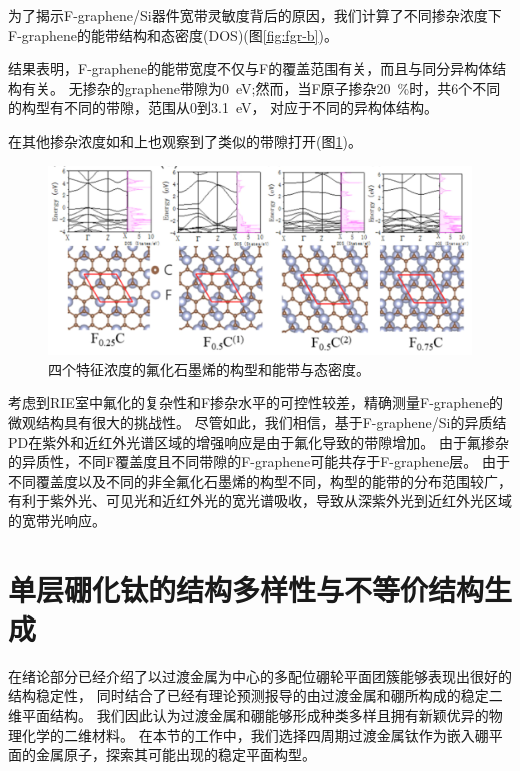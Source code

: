 为了揭示F-graphene/Si器件宽带灵敏度背后的原因，我们计算了不同掺杂浓度下F-graphene的能带结构和态密度(DOS)(图\ref{fig:fgr-b})。

结果表明，F-graphene的能带宽度不仅与F的覆盖范围有关，而且与同分异构体结构有关。
无掺杂的graphene带隙为\SI{0}{\eV};然而，当F原子掺杂\SI{20}{\percent}时，共6个不同的构型有不同的带隙，范围从\num{0}到\SI{3.1}{\eV}，
对应于不同的异构体结构。

在其他掺杂浓度如和上也观察到了类似的带隙打开(图\ref{fig:fgr-cdef})。

\begin{figure}[htb]
  \includegraphics[width=1.0\textwidth]{figs/fgr-cdef.png}
  \centering
  \caption{四个特征浓度的氟化石墨烯的构型和能带与态密度。}
  \label{fig:fgr-cdef}
\end{figure}

考虑到RIE室中氟化的复杂性和F掺杂水平的可控性较差，精确测量F-graphene的微观结构具有很大的挑战性。
尽管如此，我们相信，基于F-graphene/Si的异质结PD在紫外和近红外光谱区域的增强响应是由于氟化导致的带隙增加。
由于氟掺杂的异质性，不同F覆盖度且不同带隙的F-graphene可能共存于F-graphene层。
由于不同覆盖度以及不同的非全氟化石墨烯的构型不同，构型的能带的分布范围较广，
有利于紫外光、可见光和近红外光的宽光谱吸收，导致从深紫外光到近红外光区域的宽带光响应。

\section{单层硼化钛的结构多样性与不等价结构生成}

在绪论部分已经介绍了以过渡金属为中心的多配位硼轮平面团簇能够表现出很好的结构稳定性，
同时结合了已经有理论预测报导的由过渡金属和硼所构成的稳定二维平面结构。
我们因此认为过渡金属和硼能够形成种类多样且拥有新颖优异的物理化学的二维材料。
在本节的工作中，我们选择四周期过渡金属钛作为嵌入硼平面的金属原子，探索其可能出现的稳定平面构型。

